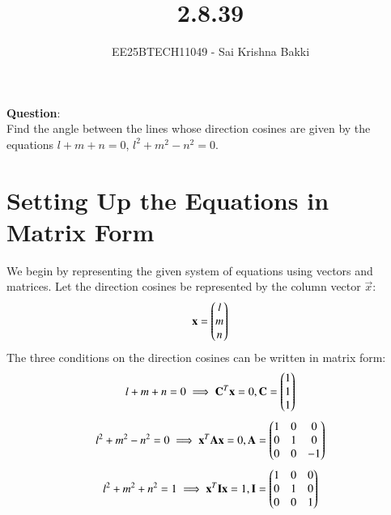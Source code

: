 \documentclass[journal]{IEEEtran}
\begin{document}

\vspace{3cm}

\title{2.8.39}
\author{EE25BTECH11049 - Sai Krishna Bakki}
 \maketitle
{\let\newpage\relax\maketitle}

\renewcommand{\thefigure}{\theenumi}
\renewcommand{\thetable}{\theenumi}
\setlength{\intextsep}{10pt} %


\renewcommand{\thetable}{\theenumi}

\textbf{Question}:\\
Find the angle between the lines whose direction cosines are given by the equations
 $l+m+n=0$, $l^2+m^2-n^2=0$. \\ 
\solution 
\section{Setting Up the Equations in Matrix Form}

We begin by representing the given system of equations using vectors and matrices. Let the direction cosines be represented by the column vector $\vec{x}$:
\begin{align}
\mathbf{x} = \begin{pmatrix}l\\m\\n\end{pmatrix}
\end{align}
The three conditions on the direction cosines can be written in matrix form:
\begin{align}
 l + m + n = 0 \implies \mathbf{C}^T \mathbf{x} = 0, \mathbf{C} = \begin{pmatrix}1\\1\\1\end{pmatrix}
 \end{align}
 \begin{align}
     l^2 + m^2 - n^2 = 0 \implies \mathbf{x}^T \mathbf{A} \mathbf{x} = 0, \mathbf{A} = \begin{pmatrix} 1 & 0 & 0 \\ 0 & 1 & 0 \\ 0 & 0 & -1 \end{pmatrix}
     \end{align}
     \begin{align}
     l^2 + m^2 + n^2 = 1 \implies \mathbf{x}^T \mathbf{I} \mathbf{x} = 1, \mathbf{I}=  \begin{pmatrix} 1 & 0 & 0 \\ 0 & 1 & 0 \\ 0 & 0 & 1 \end{pmatrix}
     \end{align}
\end{document}
